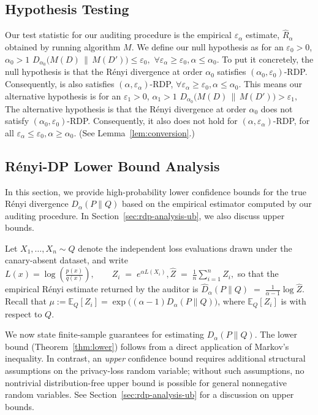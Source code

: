\documentclass{article}
\theoremstyle{plain}
\theoremstyle{definition}
\theoremstyle{remark}
\begin{document}
\subsection{Hypothesis Testing}
\label{sec:hypothesis-testing-renyi-dp}
Our test statistic for our auditing procedure is the empirical $\varepsilon_\alpha$ estimate, $\widehat R_\alpha$ obtained by running algorithm $M$. We define our null hypothesis as for an $\varepsilon_0 > 0$, $\alpha_0 > 1$
\(
D_{\alpha_0} \big( M(D) \,\|\, M(D') \big) \leq \varepsilon_0,
\)
$\forall \varepsilon_\alpha \ge \varepsilon_0, \alpha \le \alpha_0$. To put it concretely, the null hypothesis is that the R\'enyi divergence at order $\alpha_0$ satisfies $(\alpha_0, \varepsilon_0)$-RDP. Consequently, is also satisfies $(\alpha, \varepsilon_\alpha)$-RDP, $\forall \varepsilon_\alpha \ge \varepsilon_0, \alpha \le \alpha_0$.
This means our alternative hypothesis is for an $\varepsilon_1 > 0$, $\alpha_1 > 1$
\(
D_{\alpha_0} \big( M(D) \,\|\, M(D') \big) > \varepsilon_1,
\)
The alternative hypothesis is that the R\'enyi divergence at order $\alpha_0$ does not satisfy $(\alpha_0, \varepsilon_0)$-RDP. Consequently, it also does not hold for $(\alpha, \varepsilon_\alpha)$-RDP, for all $\varepsilon_\alpha \le \varepsilon_0, \alpha \ge \alpha_0$. (See Lemma~\ref{lem:conversion}.)

\subsection{R\'enyi-DP Lower Bound Analysis}
\label{sec:rdp-analysis-lb}

In this section, we provide high-probability lower
confidence bounds for the true R\'enyi divergence
$D_\alpha(P\|Q)$ based on the empirical estimator computed by
our auditing procedure. In Section~\ref{sec:rdp-analysis-ub}, we also
discuss upper bounds.

Let $X_1,\dots,X_n \sim Q$
denote the independent loss evaluations drawn under the
canary-absent dataset, and write
\(
L(x) = \log\left(\frac{p(x)}{q(x)}\right),
\qquad
Z_i \;=\; e^{\alpha L(X_i)}, 
\widehat{Z} \;=\; \frac{1}{n} \sum_{i=1}^n Z_i,
\)
so that the empirical R\'enyi estimate returned by the auditor is
\(
\widehat{D}_\alpha(P\|Q)
\;=\;
\frac{1}{\alpha - 1}\log \widehat{Z}.
\)
Recall that
$\mu := \mathbb{E}_Q[Z_i]
= \exp\!\big( (\alpha-1) D_\alpha(P\|Q) \big)$, where $\mathbb{E}_Q[Z_i]$ is with respect to $Q$.

We now state finite-sample guarantees for estimating
$D_\alpha(P\|Q)$.  The lower bound (Theorem~\ref{thm:lower})
follows from a direct application of Markov's inequality.  
In contrast, an \emph{upper}
confidence bound requires additional structural assumptions on the
privacy-loss random variable; without such assumptions,
no nontrivial distribution-free upper bound is possible for general
nonnegative random variables.  
See Section~\ref{sec:rdp-analysis-ub} for a discussion on upper bounds.
\end{document}
